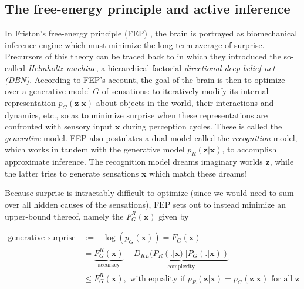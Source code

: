 \documentclass[10pt,letterpaper]{article}
\def\z{\mathbf{z}}
\def\x{\mathbf{x}}
\begin{document}
\subsection{The free-energy principle and active inference}
In Friston's free-energy principle (FEP) \citep{friston2010free,fristonAIorRL}, the brain is portrayed
as biomechanical inference engine which must minimize the long-term average of surprise.
Precursors of this theory can be traced back to \citep{dayan1995helmholtz} in which they introduced the so-called \textit{Helmholtz machine}, a hierarchical factorial \textit{directional deep belief-net (DBN)}. According to FEP's account, the goal of the brain is then to optimize over a generative model $G$ of sensations: to iteratively
modify its internal representation $p_G(\z|\x)$ about objects in the world, their interactions and dynamics, etc., so as to minimize surprise when these representations are confronted with sensory input $\x$ during perception cycles. These is called the \textit{generative} model. FEP also postulates a dual model called the \textit{recognition} model,
which works in tandem with the generative model $p_R(\z|\x)$, to accomplish approximate inference. The recognition model dreams imaginary worlds $\z$,
while the latter tries to generate sensations $\x$ which match these dreams!

Because surprise is intractably difficult to optimize (since we would need to sum over all hidden causes of the sensations), FEP sets out to instead minimize an upper-bound thereof,
namely the  $F_G^R(\x)$ given by

  \begin{equation}
    \begin{split}
      \text{generative surprise } &:= -\log(p_G(\x)) = F_G(\x) \\
      &=\underbrace{F^R_G(\x)}_{\text{accuracy}} - \underbrace{D_{KL}(P_R(.|\x) || P_G(.|\x))}_{\text{complexity}} \\
      &\le F^R_G(\x),
      \text{ with equality if }p_R(\z|\x) = p_G(\z|\x)\text{ for all } \z
    \end{split}
  \end{equation}
\end{document}
